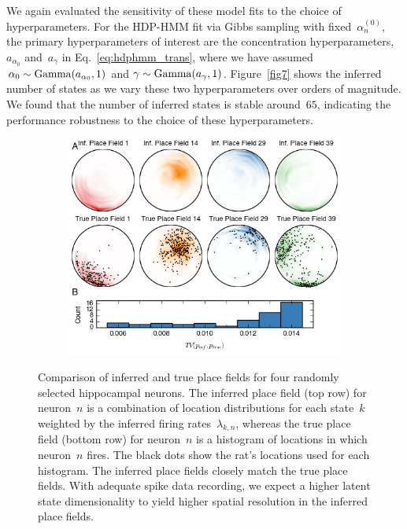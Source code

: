 We again evaluated the sensitivity of these model fits to the choice
of hyperparameters. For the HDP-HMM fit via Gibbs sampling with
fixed~$\alpha_n^{(0)}$, the primary hyperparameters of interest are the
concentration hyperparameters,~$a_{\alpha_0}$ and~$a_{\gamma}$ in
Eq.~\ref{eq:hdphmm_trans}, where we have assumed $ \alpha_0 \sim
\mathrm{Gamma}(a_{\alpha_0}, 1)$ and $ \gamma \sim \mathrm{Gamma}(a_\gamma, 1)
$.  Figure~\ref{fig7} shows the inferred number of states as we vary
these two hyperparameters over orders of magnitude. We found that the
number of inferred states is stable around~$65$, indicating the
performance robustness to the choice of these hyperparameters.

\begin{figure}[t!]
  \centering
  \begin{subfigure}[t]{5in}
    \includegraphics[width=\textwidth]{figures/ch7/Fig8}
  \end{subfigure}
  \caption[True and inferred place field comparison]{Comparison of
    inferred and true place fields for four randomly selected
    hippocampal neurons. The inferred place field (top row) for
    neuron~$n$ is a combination of location distributions for each
    state~$k$ weighted by the inferred firing rates~$\lambda_{k,n}$,
    whereas the true place field (bottom row) for neuron~$n$ is a
    histogram of locations in which neuron~$n$ fires. The black dots
    show the rat's locations used for each histogram. The inferred
    place fields closely match the true place fields. With adequate
    spike data recording, we expect a higher latent state
    dimensionality to yield higher spatial resolution in the inferred
    place fields.}
  \label{fig8}
\end{figure}

